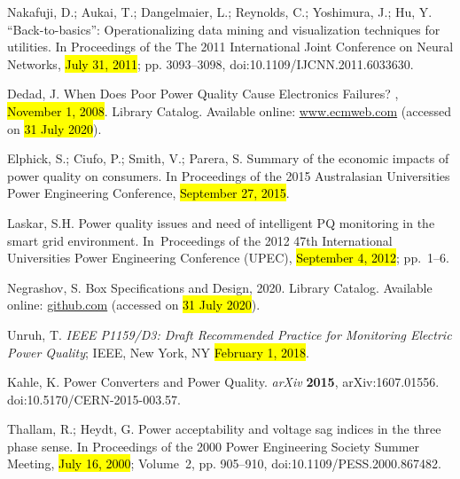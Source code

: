 \documentclass[energies,article,accept,moreauthors,pdftex]{Definitions/mdpi}
\begin{document}
\begin{thebibliography}{999}
Nakafuji, D.; Aukai, T.; Dangelmaier, L.; Reynolds, C.; Yoshimura, J.; {
Hu, Y}.
\newblock “{Back}-to-basics”: {Operationalizing} data mining and visualization
techniques for utilities.
\newblock In {Proceedings of the }The 2011 International Joint Conference on Neural Networks, \hl{July 31, 2011}; pp. 3093--3098, doi:10.1109/IJCNN.2011.6033630.

Dedad, J.
\newblock When {Does} {Poor} {Power} {Quality} {Cause} {Electronics}
{Failures}?
, {\hl{November 1, 2008}}.
\newblock Library Catalog.  Available online:  \url{www.ecmweb.com} (accessed on \hl{31 July 2020}).

Elphick, S.; Ciufo, P.; Smith, V.; Parera, S.
\newblock Summary of the economic impacts of power quality on consumers.
\newblock  In {Proceedings of the }2015 {Australasian} {Universities} {Power} {Engineering}
{Conference}, \hl{September 27, 2015}.

Laskar, S.H.
\newblock Power quality issues and need of intelligent {PQ} monitoring in the
smart grid environment.
\newblock In~{Proceedings of the }2012 47th
{International} Universities {Power} {Engineering} {Conference} ({UPEC}), \hl{September 4, 2012}; pp.~1--6.

Negrashov, S.
 {Box} {Specifications} and {Design}, 2020.
\newblock Library Catalog.  Available online:  \url{github.com} (accessed on \hl{31 July 2020}).

Unruh, T.
\newblock \emph{IEEE P1159/D3: {Draft} {Recommended} {Practice} for
{Monitoring} {Electric} {Power} {Quality}}; IEEE, New York, NY \hl{February 1, 2018}. %

Kahle, K.
\newblock Power {Converters} and {Power} {Quality}.
\newblock \emph{arXiv} \textbf{2015}, arXiv:1607.01556. doi:10.5170/CERN-2015-003.57.


Thallam, R.; Heydt, G.
\newblock Power acceptability and voltage sag indices in the three phase sense.
\newblock In {Proceedings of the } 2000 {Power} {Engineering} {Society} {Summer} {Meeting},
 \hl{July 16, 2000}; Volume~2, pp. 905--910, doi:10.1109/PESS.2000.867482.


\end{thebibliography}
\end{document}
